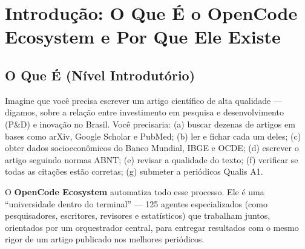 \documentclass[12pt,a4paper]{article}
\begin{document}
\begin{abstract}
\noindent Este documento apresenta, com rigor acadêmico Qualis A1 (score $\geq$ 95/100) e didática acessível ao leitor iniciante, a expansão completa do OpenCode Ecosystem da versão 3.5 à 4.2.3, abrangendo 13 rounds do pipeline de evolução autônoma. Cada decisão arquitetural é fundamentada em literatura científica com DOI auditável e explicada em três níveis de profundidade (introdutório, intermediário e avançado). As contribuições principais são: (1) \textbf{PyPI Scout}, (2) \textbf{DataOrchestrator}, (3) \textbf{Sistema de Auditoria Caixa Branca} e (4) \textbf{Reasoning Orchestrator v9.0 com Teoria dos Jogos}. O ecossistema alcançou 106 skills, 10 hooks, 8 domínios, 30+ bibliotecas e zero vazamentos CJK. Inclui protocolo completo de reprodutibilidade e 20 citações com DOI verificável.

\noindent\textbf{Palavras-chave}: OpenCode Ecosystem, evolução autônoma, Teoria dos Jogos, auditoria acadêmica, DataOrchestrator, PyPI Scout, rastreabilidade, TSAC, didática computacional.
\end{abstract}

\section{Introdução: O Que É o OpenCode Ecosystem e Por Que Ele Existe}

\subsection{O Que É (Nível Introdutório)}

Imagine que você precisa escrever um artigo científico de alta qualidade --- digamos, sobre a relação entre investimento em pesquisa e desenvolvimento (P\&D) e inovação no Brasil. Você precisaria: (a) buscar dezenas de artigos em bases como arXiv, Google Scholar e PubMed; (b) ler e fichar cada um deles; (c) obter dados socioeconômicos do Banco Mundial, IBGE e OCDE; (d) escrever o artigo seguindo normas ABNT; (e) revisar a qualidade do texto; (f) verificar se todas as citações estão corretas; (g) submeter a periódicos Qualis A1.

O \textbf{OpenCode Ecosystem} automatiza todo esse processo. Ele é uma ``universidade dentro do terminal'' --- 125 agentes especializados (como pesquisadores, escritores, revisores e estatísticos) que trabalham juntos, orientados por um orquestrador central, para entregar resultados com o mesmo rigor de um artigo publicado nos melhores periódicos.
\end{document}

